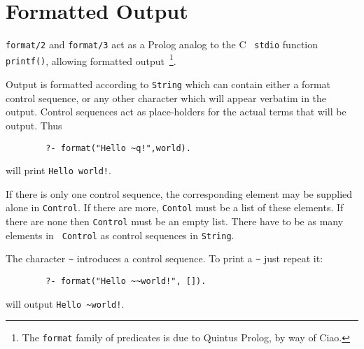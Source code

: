 \section{Formatted Output}

\begin{description}

{\tt format/2} and {\tt format/3} act as a Prolog analog to the C {\tt
stdio} function {\tt printf()}, allowing formatted
output~\footnote{The {\tt format} family of predicates is due to
Quintus Prolog, by way of Ciao.}.

Output is formatted according to {\tt String} which can contain either
a format control sequence, or any other character which will appear
verbatim in the output. Control sequences act as place-holders for the
actual terms that will be output.  Thus
\begin{verbatim}
        ?- format("Hello ~q!",world).
\end{verbatim}

\noindent
will print {\tt Hello world!}.

If there is only one control sequence, the corresponding element may
be supplied alone in {\tt Control}.  If there are more, {\tt Contol}
must be a list of these elements. If there are none then {\tt Control}
must be an empty list. There have to be as many elements in {\tt
Control} as control sequences in {\tt String}.

The character \verb|~| introduces a control sequence. To print 
        a \verb|~| just repeat it:  
        \begin{verbatim}
        ?- format("Hello ~~world!", []).
        \end{verbatim}
      \noindent
        will output  \verb|Hello ~world!|.



\end{description}
